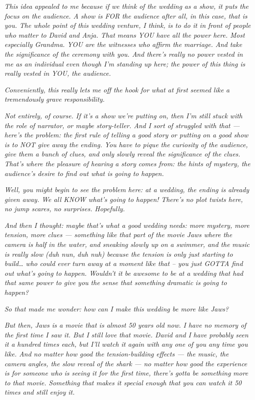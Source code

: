 \emph{This idea appealed to me because if we think of the wedding as a
show, it puts the focus on the audience. A show is FOR the audience
after all, in this case, that is you. The whole point of this wedding
venture, I think, is to do it in front of people who matter to David and
Anja. That means YOU have all the power here. Most especially Grandma.
YOU are the witnesses who affirm the marriage. And take the significance
of the ceremony with you. And there's really no power vested in me as an
individual even though I'm standing up here; the power of this thing is
really vested in YOU, the audience.}

\emph{Conveniently, this really lets me off the hook for what at first
seemed like a tremendously grave responsibility.}

\emph{Not entirely, of course. If it's a show we're putting on, then I'm
still stuck with the role of narrator, or maybe story-teller. And I sort
of struggled with that --- here's the problem: the first rule of telling
a good story or putting on a good show is to NOT give away the ending.
You have to pique the curiosity of the audience, give them a bunch of
clues, and only slowly reveal the significance of the clues. That's
where the pleasure of hearing a story comes from: the hints of mystery,
the audience's desire to find out what is going to happen.}

\emph{Well, you might begin to see the problem here: at a wedding, the
ending is already given away. We all KNOW what's going to happen!
There's no plot twists here, no jump scares, no surprises. Hopefully.}

\emph{And then I thought: maybe that's what a good wedding needs: more
mystery, more tension, more clues --- something like that part of the
movie Jaws where the camera is half in the water, and sneaking slowly up
on a swimmer, and the music is really slow (duh nun, duh nuh) because
the tension is only just starting to build\ldots{} who could ever turn
away at a moment like that -- you just GOTTA find out what's going to
happen. Wouldn't it be awesome to be at a wedding that had that same
power to give you the sense that something dramatic is going to happen?}

\emph{So that made me wonder: how can I make this wedding be more like
Jaws?}

\emph{But then, Jaws is a movie that is almost 50 years old now. I have
no memory of the first time I saw it. But I still love that movie. David
and I have probably seen it a hundred times each, but I'll watch it
again with any one of you any time you like. And no matter how good the
tension-building effects --- the music, the camera angles, the slow
reveal of the shark --- no matter how good the experience is for someone
who is seeing it for the first time, there's gotta be something more to
that movie. Something that makes it special enough that you can watch it
50 times and still enjoy it.}

